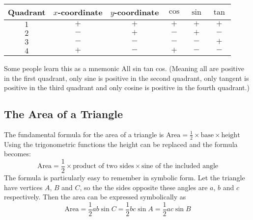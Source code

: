\qquad \qquad \qquad \qquad
\begin{tabular}[c]{|c|c|c|c|c|c|}\hline
	Quadrant  & $x$-coordinate  & $y$-coordinate  & $\cos $  & $\sin $  & $\tan $  \\
	\hline
	$1$  & $ +$  & $ +$  & $ +$  & $ +$  & $ +$  \\
	\hline
	$2$  & $ -$  & $ +$  & $ -$  & $ +$  & $ -$  \\
	\hline
	$3$  & $ -$  & $ -$  & $ -$  & $ -$  & $ +$  \\
	\hline
	$4$  & $ +$  & $ -$  & $ +$  & $ -$  & $ -$  \\
	\hline
\end{tabular}

Some people learn this as a mnemonic All sin tan cos. (Meaning all are positive in the first quadrant, only sine is positive in the second quadrant, only tangent is positive in the third quadrant and only cosine is positive in the fourth quadrant.) 

\subsection*{The Area of a Triangle}
The fundamental formula for the area of a triangle is $\text{Area} =\frac{1}{2} \times \text{base} \times \text{height}$ Using the trigonometric functions the height can be replaced and the formula becomes:
\begin{equation*}\text{Area} =\frac{1}{2} \times \text{product of two sides} \times \text{sine of the included angle}
\end{equation*}
The formula is particularly easy to remember in symbolic form. Let the triangle have vertices $A$, $B$ and $C$, so the the sides opposite these angles are $a$, $b$ and $c$ respectively. Then the area can be expressed symbolically as
\begin{equation*}\text{Area} =\frac{1}{2} a b \sin  C =\frac{1}{2} b c \sin  A =\frac{1}{2} a c \sin  B
\end{equation*}

